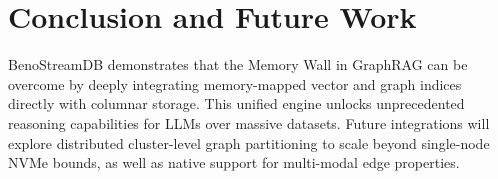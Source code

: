 \documentclass[11pt,twocolumn]{article}
\begin{document}
\section{Conclusion and Future Work}

BenoStreamDB demonstrates that the Memory Wall in GraphRAG can be overcome by deeply integrating memory-mapped vector and graph indices directly with columnar storage. This unified engine unlocks unprecedented reasoning capabilities for LLMs over massive datasets. Future integrations will explore distributed cluster-level graph partitioning to scale beyond single-node NVMe bounds, as well as native support for multi-modal edge properties.
\end{document}
